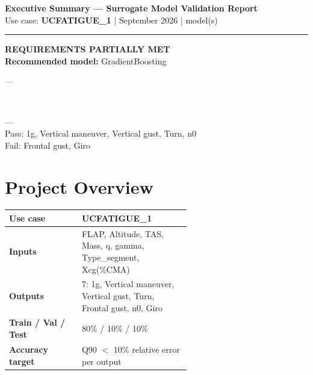 \documentclass[9pt,a4paper]{article}
\begin{document}
\thispagestyle{fancy}

\begin{center}
  {\large\bfseries\color{primary} Executive Summary --- Surrogate Model Validation Report}\\[2pt]
  {\small\color{sepgray} Use case: \textbf{UCFATIGUE\_1} \quad| September 2026 \quad| model(s)}
\end{center}
\vspace{-4pt}\noindent\rule{\linewidth}{1pt}\vspace{3pt}

\begin{center}
\colorbox{warnamber}{\begin{minipage}{0.66\linewidth}
  \vspace{5pt}\centering
  {\normalsize\bfseries REQUIREMENTS PARTIALLY MET}\\[4pt]
  {\small\bfseries Recommended model:} {\small GradientBoosting}\\[5pt]
\colorbox{r2green}{\begin{minipage}{0.97\linewidth}\vspace{2pt} \enspace---\vspace{2pt}\end{minipage}}\\[2pt]
\colorbox{warnamber}{\begin{minipage}{0.97\linewidth}\vspace{2pt} \enspace---\\[1pt]{\footnotesize Pass: 1g, Vertical maneuver, Vertical gust, Turn, n0}\\[1pt]{\footnotesize\color{red} Fail: Frontal gust, Giro}\vspace{2pt}\end{minipage}}
  \vspace{5pt}
\end{minipage}}
\end{center}

\section{Project Overview}
\renewcommand{\arraystretch}{1.2}
\begin{tabular}{|l|p{0.60\linewidth}|}
  \hline
  \textbf{Use case}           & UCFATIGUE\_1 \\ \hline
  \textbf{Inputs}             & FLAP, Altitude, TAS, Mass, q, gamma, Type\_segment, Xcg(\%CMA) \\ \hline
  \textbf{Outputs}            & 7: 1g, Vertical maneuver, Vertical gust, Turn, Frontal gust, n0, Giro \\ \hline
  \textbf{Train / Val / Test} & 80\% / 10\% / 10\% \\ \hline
  \textbf{Accuracy target}    & Q90 $<$ 10\% relative error per output \\ \hline
\end{tabular}
\end{document}
